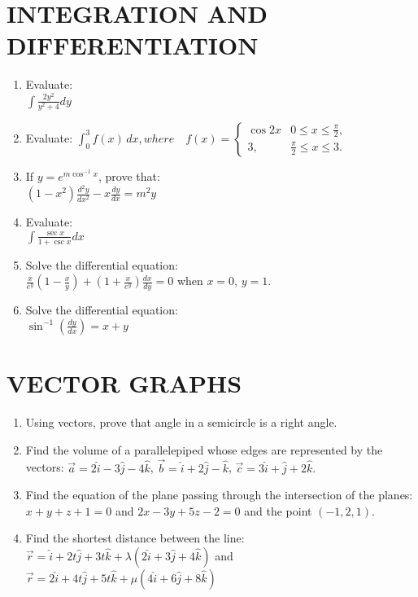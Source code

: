 \documentclass[12pt]{article}
\begin{document}
		\section{INTEGRATION AND DIFFERENTIATION}
		\begin{enumerate}
\item Evaluate:\\

$ \int \frac{2y^2}{y^2 + 4} dy $ 
\item Evaluate:
	$\int_0^3 f(x) \, dx, where \quad  f(x) =\begin{cases}
		\cos2x & 0 \leq x \leq \frac{\pi}{2}, \\3, &  \frac{\pi}{2} \leq x \leq 3.
	\end{cases}$ 
\item If $y = e^{m \cos^{-1} x}$, prove that:\\
	$ (1 - x^2) \frac{d^2 y}{dx^2} - x \frac{dy}{dx} = m^2 y $
\item Evaluate:\\
	$ \int \frac{\sec x}{1 + \csc x} dx $
\item Solve the differential equation:\\

	$\frac{x}{e^y}\left(1 - \frac{x}{y}\right) + \left(1 + \frac{x}{e^y}\right) \frac{dx}{dy} = 0$ when $x = 0$, $y = 1$.
				
				\item Solve the differential equation:\\
					$\sin^{-1} \left( \frac{dy}{dx} \right) = x + y$
		\end{enumerate}
\section{VECTOR GRAPHS}
\begin{enumerate}
	    \item Using vectors, prove that angle in a semicircle is a right angle.
	    \item Find the volume of a parallelepiped whose edges are represented by the vectors:
		    $\vec{a} = 2\hat{i} - 3\hat{j} - 4\hat{k}$, $\vec{b} = \hat{i} +2\hat{j} - \hat{k}$, $\vec{c} = 3\hat{i} + \hat{j} + 2\hat{k}.$
	    \item Find the equation of the plane passing through the intersection of the planes:
 $  x + y + z + 1 = 0 $  and $ 2x - 3y + 5z - 2 = 0 $ and the point $( -1, 2, 1).$
 \item Find the shortest distance between the line:
	 $ \vec{r} = \hat{i} + 2t\hat{j} + 3t\hat{k} + \lambda(2\hat{i} + 3\hat{j} + 4\hat{k}) $ and $\vec{r} = 2\hat{i} + 4t\hat{j}+ 5t\hat{k} + \mu(4\hat{i} + 6\hat{j} + 8\hat{k}) $
\end{enumerate}
\end{document}
